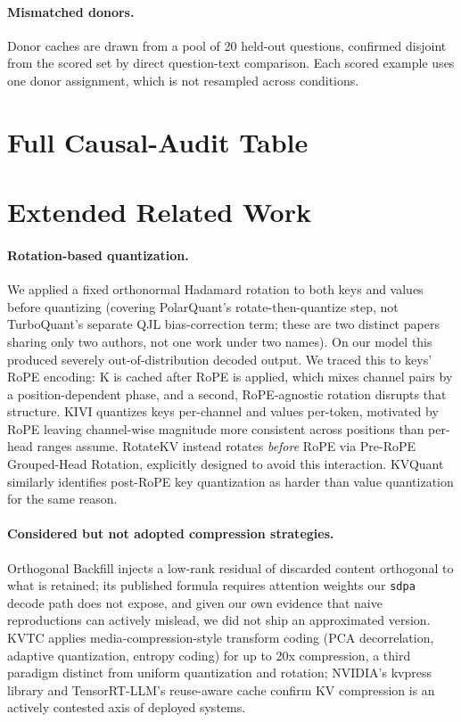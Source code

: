\documentclass[11pt]{article}
\begin{document}
\paragraph{Mismatched donors.} Donor caches are drawn from a pool of 20
held-out questions, confirmed disjoint from the scored set by direct
question-text comparison. Each scored example uses one donor assignment, which
is not resampled across conditions.

\section{Full Causal-Audit Table}
\label{app:tables}



\section{Extended Related Work}
\label{app:relwork}

\paragraph{Rotation-based quantization.}
\label{app:rotation}
We applied a fixed orthonormal
Hadamard rotation to both keys and values before quantizing
(covering PolarQuant's \citep{polarquant2026} rotate-then-quantize
step, not TurboQuant's \citep{turboquant2026} separate QJL
bias-correction term; these are two distinct papers sharing only two
authors, not one work under two names). On our model this produced
severely out-of-distribution decoded output. We traced this to keys'
RoPE encoding: K is cached after RoPE is applied, which mixes channel
pairs by a position-dependent phase, and a second, RoPE-agnostic
rotation disrupts that structure. KIVI \citep{kivi2024} quantizes keys
per-channel and values per-token, motivated by RoPE leaving channel-wise
magnitude more consistent across positions than per-head ranges assume.
RotateKV \citep{rotatekv2025} instead rotates \emph{before} RoPE via
Pre-RoPE Grouped-Head Rotation, explicitly designed to avoid this
interaction. KVQuant \citep{kvquant2024} similarly identifies post-RoPE
key quantization as harder than value quantization for the same reason.

\paragraph{Considered but not adopted compression strategies.}
Orthogonal Backfill \citep{orthobackfill2026} injects a low-rank
residual of discarded content orthogonal to what is retained; its
published formula requires attention weights our \texttt{sdpa} decode
path does not expose, and given our own evidence that naive
reproductions can actively mislead, we did not ship an approximated
version. KVTC \citep{kvtc2026} applies media-compression-style
transform coding (PCA decorrelation, adaptive quantization, entropy
coding) for up to 20x compression, a third paradigm distinct from
uniform quantization and rotation; NVIDIA's kvpress library and
TensorRT-LLM's reuse-aware cache confirm KV compression is an actively
contested axis of deployed systems.
\end{document}
